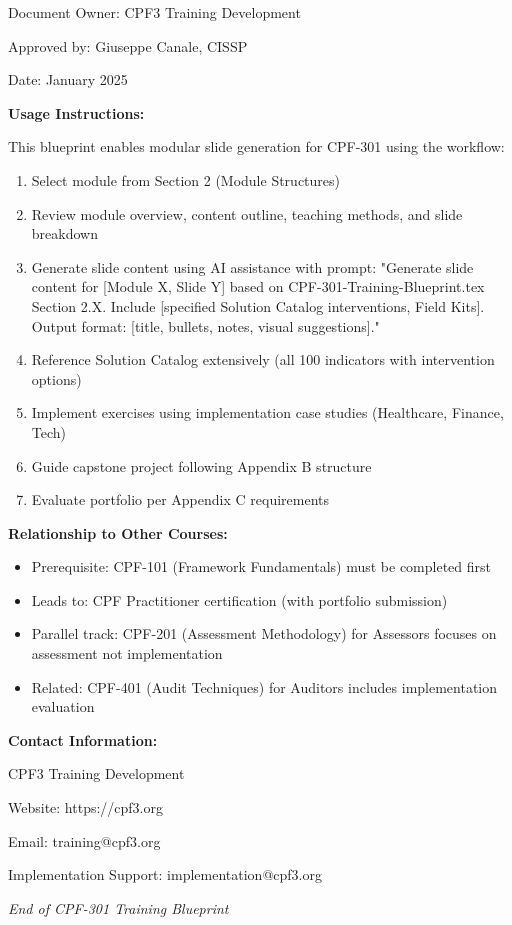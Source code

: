 \documentclass[11pt,a4paper]{article}
\begin{document}
Document Owner: CPF3 Training Development

Approved by: Giuseppe Canale, CISSP

Date: January 2025

\textbf{Usage Instructions:}

This blueprint enables modular slide generation for CPF-301 using the workflow:

\begin{enumerate}
\item Select module from Section 2 (Module Structures)
\item Review module overview, content outline, teaching methods, and slide breakdown
\item Generate slide content using AI assistance with prompt: "Generate slide content for [Module X, Slide Y] based on CPF-301-Training-Blueprint.tex Section 2.X. Include [specified Solution Catalog interventions, Field Kits]. Output format: [title, bullets, notes, visual suggestions]."
\item Reference Solution Catalog extensively (all 100 indicators with intervention options)
\item Implement exercises using implementation case studies (Healthcare, Finance, Tech)
\item Guide capstone project following Appendix B structure
\item Evaluate portfolio per Appendix C requirements
\end{enumerate}

\textbf{Relationship to Other Courses:}
\begin{itemize}
\item Prerequisite: CPF-101 (Framework Fundamentals) must be completed first
\item Leads to: CPF Practitioner certification (with portfolio submission)
\item Parallel track: CPF-201 (Assessment Methodology) for Assessors focuses on assessment not implementation
\item Related: CPF-401 (Audit Techniques) for Auditors includes implementation evaluation
\end{itemize}

\textbf{Contact Information:}

CPF3 Training Development

Website: https://cpf3.org

Email: training@cpf3.org

Implementation Support: implementation@cpf3.org

\vspace{2em}

\begin{center}
\textit{End of CPF-301 Training Blueprint}
\end{center}
\end{document}
